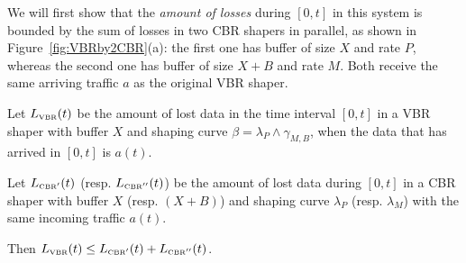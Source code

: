 \begin{figure}[!h]
  \protect{}
\end{figure}

We will first show that the {\em amount of losses} during $[0,t]$ in this system
is bounded by the sum of losses in two CBR shapers in parallel,
as shown in Figure~\ref{fig:VBRby2CBR}(a): the first one has buffer
of size $X$ and rate $P$,
whereas the second  one has buffer of size $X+B$ and rate $M$.
Both receive the same arriving traffic $a$ as the original VBR
shaper.

\begin{theorem} 
Let $L_{\mbox{{\tiny VBR}}}(t)$ be the amount of lost data in the time interval
$[0,t]$ in a VBR shaper
with buffer $X$ and shaping curve $\beta = \lambda_P \wedge \gamma_{M,B}$,
when the data that has arrived in $[0,t]$ is $a(t)$.

Let $L_{\mbox{{\tiny CBR}}^{\prime}}(t)$ (resp. $L_{\mbox{{\tiny CBR}}^{\prime \prime}}(t)$) be the amount of lost data
during $[0,t]$ in a CBR shaper with buffer $X$ (resp. $(X+B)$) and
shaping curve $\lambda_P$ (resp. $\lambda_M$) with the same incoming traffic $a(t)$.

Then $ L_{\mbox{{\tiny VBR}}}(t) \leq L_{\mbox{{\tiny CBR}}^{\prime}}(t) + L_{\mbox{{\tiny CBR}}^{\prime \prime}}(t)$.
\end{theorem}

